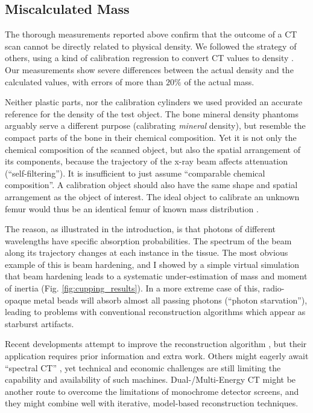 \subsection{Miscalculated Mass}
\label{sec:orgf03abe5}
The thorough measurements reported above confirm that the outcome of a CT scan cannot be directly related to physical density.
We followed the strategy of others, using a kind of calibration regression to convert CT values to density \citep{Mull1984,Phillips1997,DuPlessis2013,Durston2022,Fath2023}.
Our measurements show severe differences between the actual density and the calculated values, with errors of more than \(20 \%\) of the actual mass.


Neither plastic parts, nor the calibration cylinders we used provided an accurate reference for the density of the test object.
The bone mineral density phantoms arguably serve a different purpose (calibrating \emph{mineral} density), but resemble the compact parts of the bone in their chemical composition.
Yet it is not only the chemical composition of the scanned object, but also the spatial arrangement of its components, because the trajectory of the x-ray beam affects attenuation (``self-filtering'').
It is insufficient to just assume ``comparable chemical composition''.
A calibration object should also have the same shape and spatial arrangement as the object of interest.
The ideal object to calibrate an unknown femur would thus be an identical femur of known mass distribution \citep[which is actually attempted in clinical tomography, cf.][]{Lennie2021}.


The reason, as illustrated in the introduction, is that photons of different wavelengths have specific absorption probabilities.
The spectrum of the beam along its trajectory changes at each instance in the tissue.
The most obvious example of this is beam hardening, and I showed by a simple virtual simulation that beam hardening leads to a systematic under-estimation of mass and moment of inertia (Fig. \ref{fig:cupping_results}).
In a more extreme case of this, radio-opaque metal beads will absorb almost all passing photons (``photon starvation''), leading to problems with conventional reconstruction algorithms which appear as starburst artifacts.


Recent developments attempt to improve the reconstruction algorithm \citep{Six2019,Frenkel2022,Yang2021,Batenburg2011}, but their application requires prior information and extra work.
Others might eagerly await ``spectral CT'' \citep{Liu2023}, yet technical and economic challenges are still limiting the capability and availability of such machines.
Dual-/Multi-Energy CT might be another route to overcome the limitations of monochrome detector screens, and they might combine well with iterative, model-based reconstruction techniques.



